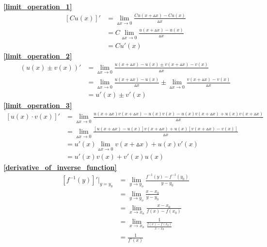 \textbf{\large \ref{limit_operation_1}}
\begin{align*}
        \left[Cu(x)\right]'&=\lim\limits_{\vartriangle x\to 0}\frac{Cu(x+\vartriangle x)-Cu(x)}{\vartriangle x}\\
        &=C\lim\limits_{\vartriangle x\to 0}\frac{u(x+\vartriangle x)-u(x)}{\vartriangle x}\\
        &=Cu'(x)
\end{align*}
\textbf{\large \ref{limit_operation_2}}
\begin{align*}
            (u(x)\pm v(x))'&=\lim\limits_{\vartriangle x\to 0}\frac{u(x+\vartriangle x)-u(x)\pm v(x+\vartriangle x)-v(x)}{\vartriangle x}\\
        &=\lim\limits_{\vartriangle x\to 0}\frac{u(x+\vartriangle x)-u(x)}{\vartriangle x}\pm\lim\limits_{\vartriangle x\to 0}\frac{v(x+\vartriangle x)-v(x)}{\vartriangle x}\\
        &=u'(x)\pm v'(x)
\end{align*}
\textbf{\large \ref{limit_operation_3}}
\begin{align*}
        \left[u(x)\cdot v(x)\right]'&=\lim\limits_{\vartriangle x\to 0}\frac{u(x+\vartriangle x)v(x+\vartriangle x)-u(x)v(x)-u(x)v(x+\vartriangle x)+u(x)v(x+\vartriangle x)}{\vartriangle x}\\
            &=\lim\limits_{\vartriangle x\to 0}\frac{\left[u(x+\vartriangle x)-u(x)\right]v(x+\vartriangle x)+u(x)\left[v(x+\vartriangle x)-v(x)\right]}{\vartriangle x}\\
            &=u'(x)\lim\limits_{\vartriangle x\to 0}v(x+\vartriangle x)+u(x)v'(x)\\
            &=u'(x)v(x)+v'(x)u(x)
\end{align*}
\textbf{\large \ref{derivative_of_inverse_function}}
\begin{align*}
        \left[f^{-1}(y)\right]'|_{y=y_0}&=\lim\limits_{y\to y_o}\frac{f^{-1}(y)-f^{-1}(y_0)}{y-y_0}\\
        &=\lim\limits_{y\to y_o}\frac{x-x_0}{y-y_0}\\
        &=\lim\limits_{x\to x_o}\frac{x-x_0}{f(x)-f(x_0)}\\
        &=\lim\limits_{x\to x_o}\frac{1}{\frac{f(x)-f(x_0)}{x-x_0}}\\
        &=\frac{1}{f'(x)}
\end{align*}

